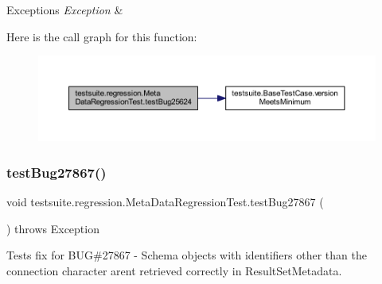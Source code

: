 \begin{DoxyExceptions}{Exceptions}
{\em Exception} & \\
\hline
\end{DoxyExceptions}
Here is the call graph for this function\+:
\nopagebreak
\begin{figure}[H]
\begin{center}
\leavevmode
\includegraphics[width=350pt]{classtestsuite_1_1regression_1_1_meta_data_regression_test_a2a97b03d5a86fcd988e7648006a385a6_cgraph}
\end{center}
\end{figure}
\mbox{\label{classtestsuite_1_1regression_1_1_meta_data_regression_test_ad4bf6071c2581485e1d8d44e36d385ae}} 
\subsubsection{\texorpdfstring{test\+Bug27867()}{testBug27867()}}
{\footnotesize\ttfamily void testsuite.\+regression.\+Meta\+Data\+Regression\+Test.\+test\+Bug27867 (\begin{DoxyParamCaption}{ }\end{DoxyParamCaption}) throws Exception}

Tests fix for B\+UG\#27867 -\/ Schema objects with identifiers other than the connection character aren\textquotesingle{}t retrieved correctly in Result\+Set\+Metadata.


